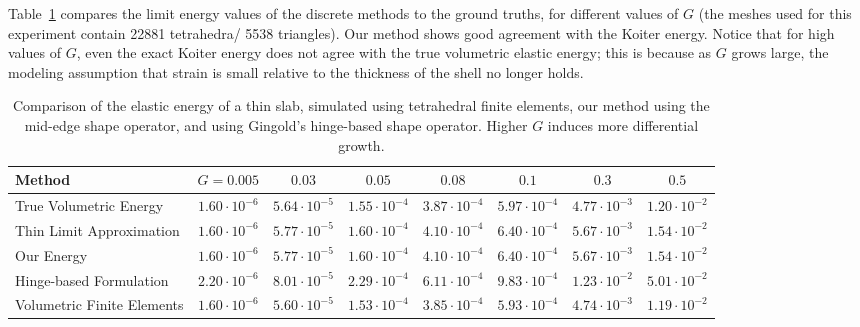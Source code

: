 \documentclass[timestamp,acmtog]{acmart}
\begin{document}
Table~\ref{tab:energy} compares the limit energy values of the discrete methods to the ground truths, for different values of $G$ (the meshes used for this experiment contain 22881 tetrahedra/ 5538 triangles).  Our method shows good agreement with the Koiter energy. Notice that for high values of $G$, even the exact Koiter energy does not agree with the true volumetric elastic energy; this is because as $G$ grows large, the modeling assumption that strain is small relative to the thickness of the shell no longer holds. 
\begin{table}
\begin{tabular}{l|ccccccc}
Method & $G=0.005$ & $0.03$ & $0.05$ & $0.08$ & $0.1$ & $0.3$ & $0.5$  \\
\hline
True Volumetric Energy & $1.60\cdot 10^{-6}$ & $5.64 \cdot 10^{-5}$ & $1.55 \cdot 10^{-4}$ & $3.87 \cdot 10^{-4}$ & $5.97 \cdot 10^{-4}$ & $4.77 \cdot 10^{-3}$ & $1.20 \cdot 10^{-2}$ \\
Thin Limit Approximation & $1.60\cdot 10^{-6}$ & $5.77\cdot 10^{-5}$  &  $1.60\cdot10^{-4}$ & $4.10\cdot 10^{-4}$ & $6.40 \cdot 10^{-4}$ & $5.67 \cdot 10^{-3}$ & $1.54\cdot 10^{-2}$\\
\hline
Our Energy & $1.60 \cdot 10^{-6}$ & $5.77 \cdot 10^{-5}$ & $1.60 \cdot 10^{-4}$ & $4.10 \cdot 10^{-4}$ & $6.40 \cdot 10^{-4}$ & $5.67 \cdot 10^{-3}$ & $1.54 \cdot 10^{-2}$ \\
Hinge-based Formulation & $2.20 \cdot 10^{-6}$ & $8.01 \cdot 10^{-5}$ & $2.29 \cdot 10^{-4}$ & $6.11 \cdot 10^{-4}$ & $9.83 \cdot 10^{-4}$ & $1.23 \cdot 10^{-2}$ & $5.01 \cdot 10^{-2}$ \\
Volumetric Finite Elements & $1.60 \cdot 10^{-6}$ & $5.60 \cdot 10^{-5}$ & $1.53 \cdot 10^{-4}$ & $3.85 \cdot 10^{-4}$ & $5.93 \cdot 10^{-4}$ & $4.74 \cdot 10^{-3}$ & $1.19 \cdot 10^{-2}$
\end{tabular}
\caption{Comparison of the elastic energy of a thin slab, simulated using tetrahedral finite elements, our method using the mid-edge shape operator, and using Gingold's hinge-based shape operator. Higher $G$ induces more differential growth.}
\label{tab:energy}
\end{table}
\end{document}
